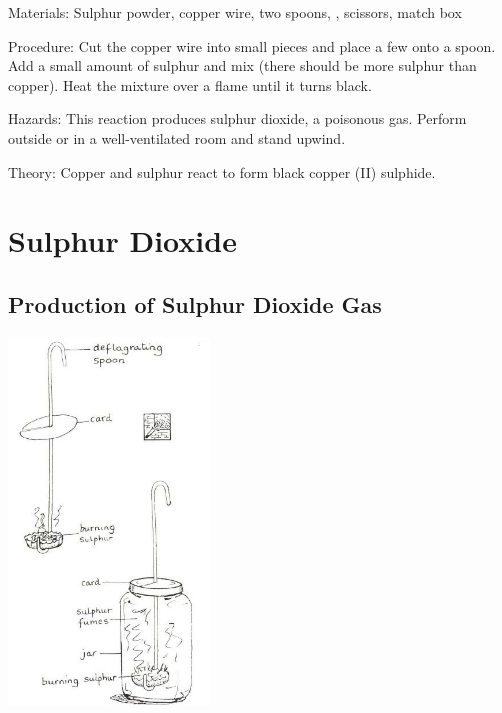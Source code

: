 \begin{multicols}{2}
\begin{description*}
\item[Materials:]{Sulphur powder, copper wire, two spoons, , scissors, match box}
\item[Procedure:]{Cut the copper wire into small pieces and place a few onto a spoon. Add a small amount of sulphur and mix (there should be more sulphur than copper). Heat the mixture over a flame until it turns black.}
\item[Hazards:]{This reaction produces sulphur dioxide, a poisonous gas. Perform outside or in a well-ventilated room and stand upwind.}
\item[Theory:]{Copper and sulphur react to form black copper (II) sulphide.}
\end{description*}

\columnbreak


\section*{Sulphur Dioxide} 


\subsection{Production of Sulphur Dioxide Gas} %

\begin{center}
\includegraphics[width=0.4\textwidth]{./img/source/sulphur-dioxide.jpg}
\end{center}


\end{multicols}
